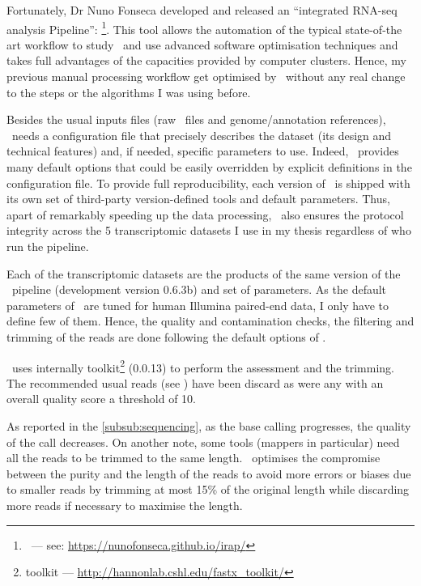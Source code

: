 Fortunately, Dr Nuno Fonseca developed and released
an ``integrated RNA-seq analysis Pipeline'': \irap\footnote{\irap\ ---
see: \href{https://nunofonseca.github.io/irap/}%
{https://nunofonseca.github.io/irap/}}.
This tool allows the automation of the typical
state-of-the art workflow to study
\Rnaseq\ and use advanced software optimisation techniques and takes full
advantages of the capacities provided by computer clusters. Hence, my previous
manual processing workflow get optimised by \irap\ without any real change to
the steps or the algorithms I was using before.

Besides the usual inputs files (raw \Rnaseq\ files and genome/annotation
references), \irap\ needs a configuration file that precisely describes the
dataset (its design and technical features) and, if needed, specific parameters
to use. Indeed, \irap\ provides many default options that could be easily
overridden by explicit definitions in the configuration file. To provide
full reproducibility, each version of \irap\ is shipped with
its own set of third-party version-defined tools and default parameters. Thus,
apart of remarkably speeding up the data processing, \irap\
also ensures the protocol integrity across the 5 transcriptomic datasets I
use in my thesis regardless of who run the pipeline.

Each of the transcriptomic datasets are the products of the same version of
the \irap\ pipeline (development version 0.6.3b) and set of parameters. As the
default parameters of \irap\ are tuned for human Illumina paired-end data,
I only have to define few of them. Hence, the quality and contamination checks,
the filtering and trimming of the reads are done following the default options
of \irap.

\irap\ uses internally  toolkit\footnote{ toolkit ---
\href{http://hannonlab.cshl.edu/fastx\_toolkit/}%
{http://hannonlab.cshl.edu/fastx\_toolkit/}} (0.0.13) to perform the
assessment and the trimming. The recommended usual reads (see )
have been discard as were any with an overall quality score a threshold of 10.

As reported in the \cref{subsub:sequencing}, as the base calling progresses,
the quality of the call decreases.
On another note, some tools (mappers in particular) need
all the reads to be trimmed to the same length. \irap\ optimises the compromise
between the purity and the length of the reads to avoid more errors or
biases due to smaller reads \mycite{Trimwisely} by trimming at most 15\% of the
original length while discarding more reads if necessary to maximise the length.

